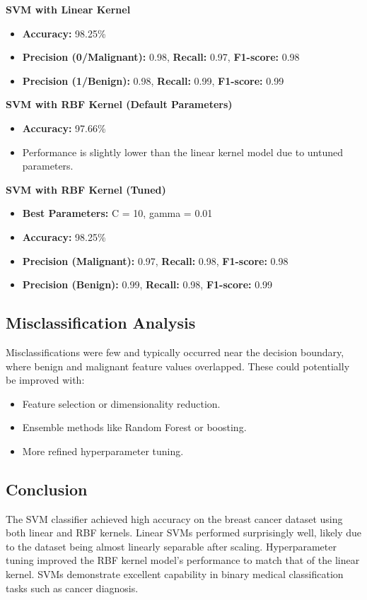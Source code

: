 \documentclass[a4paper,12pt]{article}
\begin{document}
\textbf{SVM with Linear Kernel}
\begin{itemize}
    \item \textbf{Accuracy:} 98.25\%
    \item \textbf{Precision (0/Malignant):} 0.98, \textbf{Recall:} 0.97, \textbf{F1-score:} 0.98
    \item \textbf{Precision (1/Benign):} 0.98, \textbf{Recall:} 0.99, \textbf{F1-score:} 0.99
\end{itemize}

\textbf{SVM with RBF Kernel (Default Parameters)}
\begin{itemize}
    \item \textbf{Accuracy:} 97.66\%
    \item Performance is slightly lower than the linear kernel model due to untuned parameters.
\end{itemize}

\textbf{SVM with RBF Kernel (Tuned)}
\begin{itemize}
    \item \textbf{Best Parameters:} C = 10, gamma = 0.01
    \item \textbf{Accuracy:} 98.25\%
    \item \textbf{Precision (Malignant):} 0.97, \textbf{Recall:} 0.98, \textbf{F1-score:} 0.98
    \item \textbf{Precision (Benign):} 0.99, \textbf{Recall:} 0.98, \textbf{F1-score:} 0.99
\end{itemize}

\subsection{Misclassification Analysis}
Misclassifications were few and typically occurred near the decision boundary, where benign and malignant feature values overlapped. These could potentially be improved with:
\begin{itemize}
    \item Feature selection or dimensionality reduction.
    \item Ensemble methods like Random Forest or boosting.
    \item More refined hyperparameter tuning.
\end{itemize}

\subsection{Conclusion}
The SVM classifier achieved high accuracy on the breast cancer dataset using both linear and RBF kernels. Linear SVMs performed surprisingly well, likely due to the dataset being almost linearly separable after scaling. Hyperparameter tuning improved the RBF kernel model’s performance to match that of the linear kernel. SVMs demonstrate excellent capability in binary medical classification tasks such as cancer diagnosis.
\end{document}
